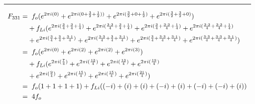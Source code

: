 \documentclass{article}
\begin{document}
\noindent\rule{12cm}{0.4pt}
\begin{align*}
	F_{331} =& \hspace{0.2cm}  f_{o}  (e^{2 \pi i (0)} 
	+ e^{2 \pi i (0 + \frac{3}{2} + \frac{1}{2}))} 
	+ e^{2 \pi i (\frac{3}{2} + 0 + \frac{1}{2})} 
	+ e^{2 \pi i (\frac{3}{2} + \frac{3}{2} + 0)})  \\
	&+ f_{Li} (e^{2 \pi i (\frac{3}{4} + \frac{3}{4} + \frac{1}{4})}  
	+ e^{2 \pi i (\frac{3 \cdot 3}{4} + \frac{3}{4} + \frac{1}{4})} 
	+ e^{2 \pi i (\frac{3}{4} + \frac{3 \cdot 3}{4} + \frac{1}{4})} 
	+ e^{2 \pi i (\frac{3 \cdot 3}{4} + \frac{3 \cdot 3}{4} + \frac{1}{4})} \\
	&+ e^{2 \pi i (\frac{3}{4} + \frac{3}{4} + \frac{3 \cdot 1}{4})}
	+ e^{2 \pi i (\frac{3 \cdot 3}{4} + \frac{3}{4} + \frac{3 \cdot 1}{4})} 
	+ e^{2 \pi i (\frac{3}{4} + \frac{3 \cdot 3}{4} + \frac{3 \cdot 1}{4})} 
	+ e^{2 \pi i (\frac{3 \cdot 3}{4} + \frac{3 \cdot 3}{4} + \frac{3 \cdot 1}{4})}) \\  
	=& \hspace{0.2cm}  f_{o}  (e^{2 \pi i (0)} 
	+ e^{2 \pi i (2)} 
	+ e^{2 \pi i (2)} 
	+ e^{2 \pi i (3)})  \\
	&+ f_{Li} (e^{2 \pi i (\frac{7}{4})}  
	+ e^{2 \pi i (\frac{13}{4})} 
	+ e^{2 \pi i (\frac{13}{4})} 
	+ e^{2 \pi i (\frac{19}{4})} \\
	&+ e^{2 \pi i (\frac{9}{4})}
	+ e^{2 \pi i (\frac{15}{4})} 
	+ e^{2 \pi i (\frac{15}{4})} 
	+ e^{2 \pi i (\frac{21}{4})}) \\
	=& \hspace{0.2cm}  f_{o}  (1  + 1 + 1 + 1) + f_{Li}((-i) + (i) + (i) + (-i) + (i) + (-i) + (-i) + (i)) \\
	=& \hspace{0.2cm} 4f_{o} 
\end{align*}
\end{document}
